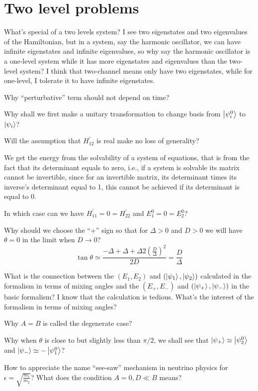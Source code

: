 \section{Two level problems}
What's special of a two levels system? I see two eigenstates and two eigenvalues of the Hamiltonian, but in a system, say the harmonic oscillator, we can have infinite eigenstates and infinite eigenvalues, so why say the harmonic oscillator is a one-level system while it has more eigenstates and eigenvalues than the two-level system? I think that two-channel means only have two eigenstates, while for one-level, I tolerate it to have infinite eigenstates.

Why “perturbative” term should not depend on time?

Why shall we first make a unitary transformation to change basis from $\left\lvert \psi_{i}^{0}\right\rangle$ to $\left\lvert \psi_i\right\rangle$?

Will the assumption that $H_{12}^{'}$ is real make no loss of generality? 

We get the energy from the solvability of a system of equations, that is from the fact that its determinant equals to zero, i.e., if a system is solvable its matrix cannot be invertible, since for an invertible matrix, its determinant times its inverse's determinant equal to 1, this cannot be achieved if its determinant is equal to 0.

In which case can we have $H_{11}^{'}=0=H_{22}^{'}$ and $E_1^{0}=0=E_2^{0}$?

Why should we choose the “+” sign so that for $\Delta>0$ and $D>0$ we will have $\theta=0$ in the limit when $D\longrightarrow 0$? 
$$
\tan\theta\simeq \frac{-\Delta+\Delta+\Delta2\left(\frac{D}{\Delta}\right)^2}{2D}=\frac{D}{\Delta}
$$

What is the connection between the $(E_{1},E_{2})$ and $(\left\lvert \psi_{1}\right\rangle,\left\lvert \psi_{2}\right\rangle)$ calculated in the formalism in terms of mixing angles and the $(E_{+},E_{-})$ and $(\left\lvert \psi_{+}\right\rangle,\left\lvert \psi_{-}\right\rangle)$ in the basic formalism? I know that the calculation is tedious. What's the interest of the formalism in terms of mixing angles?

Why $A=B$ is called the degenerate case?

Why when $\theta$ is close to but slightly less than $\pi/2$, we shall see that $\left\lvert \psi_{+}\right\rangle\simeq \left\lvert \psi_{2}^{0}\right\rangle$ and $\left\lvert \psi_{-}\right\rangle\simeq -\left\lvert \psi_{1}^{0}\right\rangle$?

How to appreciate the name “see-saw” mechanism in neutrino physics for $\epsilon=\sqrt{\frac{m_1}{m_2}}$? What does the condition $A=0,D\ll B$ means?

